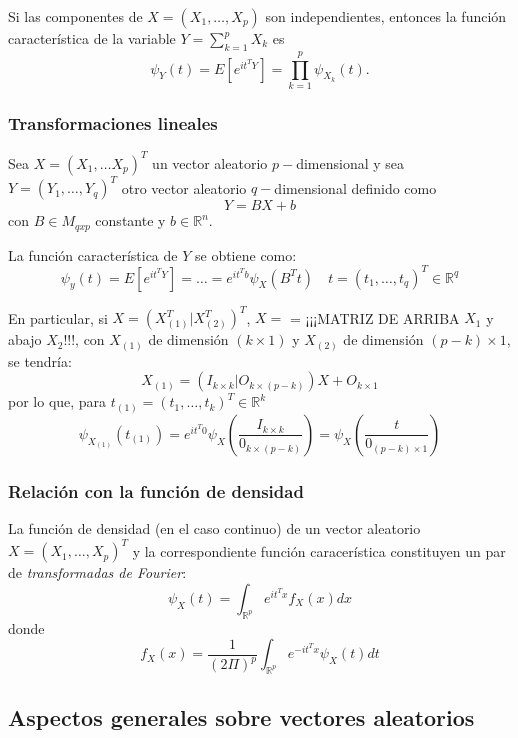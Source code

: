 \begin{nprop}
  Si las componentes de \(X=(X_1,\dots, X_p)\) son independientes, entonces la función característica de la variable \(Y=\sum_{k=1}^p X_k\) es \[\psi_Y(t)=E[e^{it^TY}] = \prod_{k=1}^p\psi_{X_k}(t).\]
\end{nprop}

\subsubsection{Transformaciones lineales}

Sea $X = (X_1, \dots X_p)^T$ un vector aleatorio $p-$dimensional y sea $Y = (Y_1,\dots,Y_q)^T$ otro vector aleatorio $q-$dimensional definido como
\[
Y = BX + b
\]
con $B \in M_{qxp}$ constante y $b\in \mathbb R ^n$.

\begin{nprop}
  La función característica de $Y$ se obtiene como:
  \[
  \psi_y(t) = E[e^{it^T Y}] = \dots = e^{it^T b} \psi_X(B^T t) \quad t = (t_1,\dots,t_q)^T \in \mathbb R^q
  \]
\end{nprop}
  En particular, si $X= ( X_{(1)}^T | X_{(2)}^T)^T$, $X=$ = ¡¡¡MATRIZ DE ARRIBA $X_1$ y abajo $X_2$!!!, con $X_{(1)}$ de dimensión $(k\times1)$ y $X_{(2)}$ de dimensión $(p-k) \times 1$, se tendría:
  \[
X_{(1)} = ( I_{k\times k} | O_{k \times(p-k)})X + O_{k\times 1}
\]
por lo que, para $t_{(1)} = (t_1,\dots,t_k)^T \in \mathbb R^k$
\[
\psi_{X_{(1)}}(t_{(1)}) = e^{it^T 0} \psi_X(\frac{I_{k\times k}}{0_{k\times(p-k)}} ) = \psi_X(\frac{t}{0_{(p-k)\times1}})
\]

\subsubsection{Relación con la función de densidad}

La función de densidad (en el caso continuo) de un vector aleatorio $X = (X_1,\dots,X_p)^T$ y la correspondiente función caracerística constituyen un par de \emph{transformadas de Fourier}:
\[
\psi_X(t) = \int_{\mathbb R ^p} e^{i t^T x} f_X(x) dx 
\]
donde
\[
f_X(x) =  \dfrac{1}{(2\Pi)^p} \int_{\mathbb R^p} e^{- i t^T x} \psi_X(t) dt
\]


\subsection{Aspectos generales sobre vectores aleatorios}

